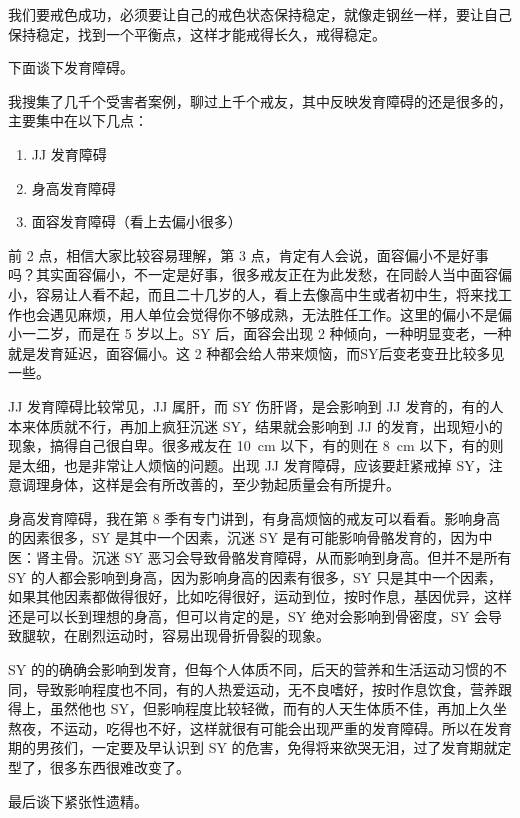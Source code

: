 \documentclass{ctexart}
\begin{document}
我们要戒色成功，必须要让自己的戒色状态保持稳定，就像走钢丝一样，要让自己保持稳定，找到一个平衡点，这样才能戒得长久，戒得稳定。

下面谈下发育障碍。

我搜集了几千个受害者案例，聊过上千个戒友，其中反映发育障碍的还是很多的，主要集中在以下几点：

\begin{enumerate}
    \item JJ 发育障碍
    \item 身高发育障碍
    \item 面容发育障碍（看上去偏小很多）
\end{enumerate}

前 2 点，相信大家比较容易理解，第 3 点，肯定有人会说，面容偏小不是好事吗？其实面容偏小，不一定是好事，很多戒友正在为此发愁，在同龄人当中面容偏小，容易让人看不起，而且二十几岁的人，看上去像高中生或者初中生，将来找工作也会遇见麻烦，用人单位会觉得你不够成熟，无法胜任工作。这里的偏小不是偏小一二岁，而是在 5 岁以上。SY 后，面容会出现 2 种倾向，一种明显变老，一种就是发育延迟，面容偏小。这 2 种都会给人带来烦恼，而SY后变老变丑比较多见一些。

JJ 发育障碍比较常见，JJ 属肝，而 SY 伤肝肾，是会影响到 JJ 发育的，有的人本来体质就不行，再加上疯狂沉迷 SY，结果就会影响到 JJ 的发育，出现短小的现象，搞得自己很自卑。很多戒友在 \SI{10}{\centi\metre} 以下，有的则在 \SI{8}{\centi\metre} 以下，有的则是太细，也是非常让人烦恼的问题。出现 JJ 发育障碍，应该要赶紧戒掉 SY，注意调理身体，这样是会有所改善的，至少勃起质量会有所提升。

身高发育障碍，我在第 8 季有专门讲到，有身高烦恼的戒友可以看看。影响身高的因素很多，SY 是其中一个因素，沉迷 SY 是有可能影响骨骼发育的，因为中医：肾主骨。沉迷 SY 恶习会导致骨骼发育障碍，从而影响到身高。但并不是所有 SY 的人都会影响到身高，因为影响身高的因素有很多，SY 只是其中一个因素，如果其他因素都做得很好，比如吃得很好，运动到位，按时作息，基因优异，这样还是可以长到理想的身高，但可以肯定的是，SY 绝对会影响到骨密度，SY 会导致腿软，在剧烈运动时，容易出现骨折骨裂的现象。

SY 的的确确会影响到发育，但每个人体质不同，后天的营养和生活运动习惯的不同，导致影响程度也不同，有的人热爱运动，无不良嗜好，按时作息饮食，营养跟得上，虽然他也 SY，但影响程度比较轻微，而有的人天生体质不佳，再加上久坐熬夜，不运动，吃得也不好，这样就很有可能会出现严重的发育障碍。所以在发育期的男孩们，一定要及早认识到 SY 的危害，免得将来欲哭无泪，过了发育期就定型了，很多东西很难改变了。

最后谈下紧张性遗精。
\end{document}
